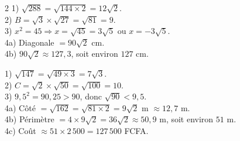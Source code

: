 \begin{multicols}{2}
1) $\sqrt{288}=\sqrt{144\times2}=12\sqrt2$.\\
2) $B=\sqrt3\times\sqrt{27}=\sqrt{81}=9$.\\
3) $x^{2}=45\Rightarrow x=\sqrt{45}=3\sqrt5$ ou $x=-3\sqrt5$.\\
4a) Diagonale $=90\sqrt2$ cm.\\
4b) $90\sqrt2\approx127{,}3$, soit environ $127$ cm.

1) $\sqrt{147}=\sqrt{49\times3}=7\sqrt3$.\\
2) $C=\sqrt2\times\sqrt{50}=\sqrt{100}=10$.\\
3) $9{,}5^{2}=90{,}25>90$, donc $\sqrt{90}<9{,}5$.\\
4a) Côté $=\sqrt{162}=\sqrt{81\times2}=9\sqrt2$ m $\approx12{,}7$ m.\\
4b) Périmètre $=4\times9\sqrt2=36\sqrt2\approx50{,}9$ m, soit environ $51$ m.\\
4c) Coût $\approx51\times2\,500=127\,500$ FCFA.

\end{multicols}
\exercicesBanner
